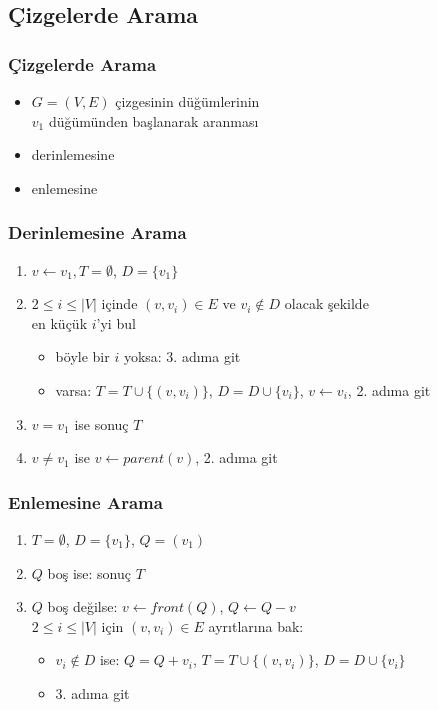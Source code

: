 \documentclass[dvipsnames]{beamer}
\theoremstyle{definition}
\theoremstyle{example}
\theoremstyle{plain}
\begin{document}
\subsection{Çizgelerde Arama}

\begin{frame}
  \frametitle{Çizgelerde Arama}

  \begin{itemize}
    \item $G=(V,E)$ çizgesinin düğümlerinin\\
      $v_1$ düğümünden başlanarak aranması

    \bigskip
    \item derinlemesine
    \item enlemesine
  \end{itemize}
\end{frame}

\begin{frame}
  \frametitle{Derinlemesine Arama}

  \begin{enumerate}
    \item $v \leftarrow v_1, T=\emptyset$, $D=\{v_1\}$

    \pause
    \item $2 \leq i \leq |V|$ içinde $(v,v_i) \in E$ ve $v_i \notin D$
      olacak şekilde\\
      en küçük $i$'yi bul
      \begin{itemize}
        \item böyle bir $i$ yoksa: 3. adıma git
        \item varsa: $T=T \cup \{(v,v_i)\}$, $D=D \cup \{v_i\}$,
          $v \leftarrow v_i$, 2. adıma git
      \end{itemize}

    \pause
    \item $v=v_1$ ise sonuç $T$

    \pause
    \item $v \neq v_1$ ise $v \leftarrow parent(v)$, 2. adıma git
  \end{enumerate}
\end{frame}

\begin{frame}
  \frametitle{Enlemesine Arama}

  \begin{enumerate}
    \item $T=\emptyset$, $D=\{v_1\}$, $Q=(v_1)$

    \pause
    \item $Q$ boş ise: sonuç $T$
    \item $Q$ boş değilse: $v \leftarrow front(Q)$, $Q \leftarrow Q - v$\\
      $2 \leq i \leq |V|$ için $(v,v_i) \in E$ ayrıtlarına bak:
    \begin{itemize}
      \item $v_i \notin D$ ise: $Q = Q + v_i$, $T = T \cup \{(v,v_i)\}$,
        $D=D \cup \{v_i\}$
       \item 3. adıma git
    \end{itemize}
  \end{enumerate}
\end{frame}
\end{document}
